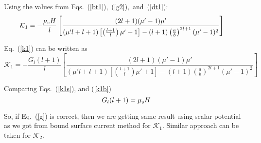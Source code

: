 Using the values from Eqs.~(\ref{bt1}),~(\ref{g2}),~and~(\ref{dt1}):
\begin{equation}\label{k1s}
\mathcal{K}_1=-\frac{\mu_{\scriptscriptstyle 0} H}{l}\left[\frac{(2l+1)(\mu'-1)\mu'}{(\mu'l+l+1)\left[\left(\frac{l+1}{l}\right)\mu'+1\right]-(l+1)\left(\frac{a}{b}\right)^{2l+1}(\mu'-1)^2}\right]\;\;\;\;\;
\end{equation}

Eq.~(\ref{k1}) can be written as
\begin{equation}\label{k1b}
\mathcal{K}_1=-\frac{G_l (l+1)}{l}\left[\frac{(2l+1)(\mu'-1)\mu'}{(\mu'l+l+1)\left[\left(\frac{l+1}{l}\right)\mu'+1\right]-(l+1)\left(\frac{a}{b}\right)^{2l+1}(\mu'-1)^2}\right]
\end{equation}

Comparing Eqs.~(\ref{k1s}), and (\ref{k1b})
\begin{equation}\label{g}
G_l(l+1)=\mu_{\scriptscriptstyle 0} H
\end{equation}

So, if Eq.~(\ref{g}) is correct, then we are getting same result using scalar potential as we got from bound surface current method for $\mathcal{K}_1$. Similar approach can be taken for $\mathcal{K}_2$.


